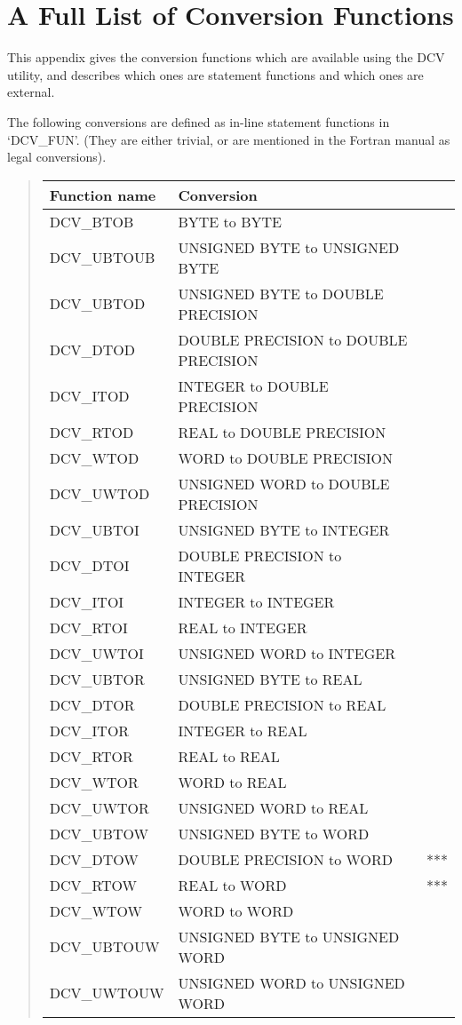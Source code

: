\documentclass[twoside,11pt,nolof]{starlink}
\begin{document}
\newpage

\section{A Full List of Conversion Functions\label{ap_b}}

This appendix gives the conversion functions which are available using
the DCV utility, and describes which ones are statement functions and
which ones are external.

The following conversions are defined as in-line statement functions in
`DCV\_FUN'. (They are either trivial, or are mentioned in the Fortran
manual as legal conversions).
\begin{quote}
\begin{tabular}{lll}
\textbf{Function name} & \bf {Conversion} \\
\hline
DCV\_BTOB   &BYTE to BYTE \\
DCV\_UBTOUB &UNSIGNED BYTE to UNSIGNED BYTE \\
DCV\_UBTOD  &UNSIGNED BYTE to DOUBLE PRECISION \\
DCV\_DTOD   &DOUBLE PRECISION to DOUBLE PRECISION \\
DCV\_ITOD   &INTEGER to DOUBLE PRECISION \\
DCV\_RTOD   &REAL to DOUBLE PRECISION \\
DCV\_WTOD   &WORD to DOUBLE PRECISION \\
DCV\_UWTOD  &UNSIGNED WORD to DOUBLE PRECISION \\
DCV\_UBTOI  &UNSIGNED BYTE to INTEGER \\
DCV\_DTOI   &DOUBLE PRECISION to INTEGER \\
DCV\_ITOI   &INTEGER to INTEGER \\
DCV\_RTOI   &REAL to INTEGER \\
DCV\_UWTOI  &UNSIGNED WORD to INTEGER \\
DCV\_UBTOR  &UNSIGNED BYTE to REAL \\
DCV\_DTOR   &DOUBLE PRECISION to REAL \\
DCV\_ITOR   &INTEGER to REAL \\
DCV\_RTOR   &REAL to REAL \\
DCV\_WTOR   &WORD to REAL \\
DCV\_UWTOR  &UNSIGNED WORD to REAL \\
DCV\_UBTOW  &UNSIGNED BYTE to WORD \\
DCV\_DTOW   &DOUBLE PRECISION to WORD       &*** \\
DCV\_RTOW   &REAL to WORD                   &*** \\
DCV\_WTOW   &WORD to WORD \\
DCV\_UBTOUW &UNSIGNED BYTE to UNSIGNED WORD \\
DCV\_UWTOUW &UNSIGNED WORD to UNSIGNED WORD \\
\end{tabular}
\end{quote}
\end{document}
